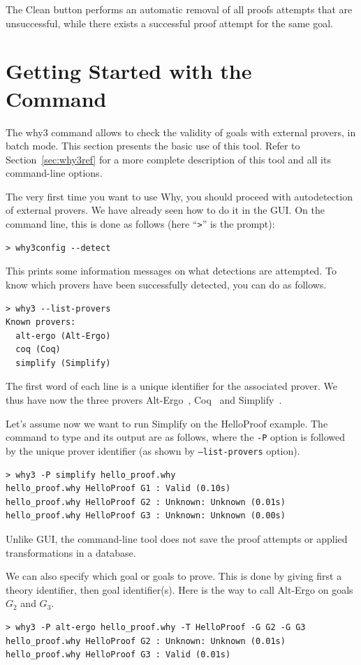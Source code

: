 The \textsf{Clean} button performs an automatic removal of all proofs
attempts that are unsuccessful, while there exists a successful proof
attempt for the same goal.

\section{Getting Started with the \why Command}
\label{sec:batch}

The why3 command allows to check the validity of goals with external
provers, in batch mode. This section presents the basic use of this
tool. Refer to Section~\ref{sec:why3ref} for a more complete
description of this tool and all its command-line options.

The very first time you want to use Why, you should proceed with
autodetection of external provers. We have already seen how to do
it in the \why GUI. On the command line, this is done as follows
(here ``\texttt{>}'' is the prompt):
\begin{verbatim}
> why3config --detect
\end{verbatim}
This prints some information messages on what detections are attempted. To know which
provers have been successfully detected, you can do as follows.
\begin{verbatim}
> why3 --list-provers
Known provers:
  alt-ergo (Alt-Ergo)
  coq (Coq)
  simplify (Simplify)
\end{verbatim}
The first word of each line is a unique identifier for the associated prover. We thus
have now the three provers Alt-Ergo~\cite{ergo}, Coq~\cite{CoqArt} and
Simplify~\cite{simplify05}.

Let's assume now we want to run Simplify on the HelloProof
example. The command to type and its output are as follows, where the
\verb|-P| option is followed by the unique prover identifier (as shown
by \texttt{--list-provers} option).
\begin{verbatim}
> why3 -P simplify hello_proof.why
hello_proof.why HelloProof G1 : Valid (0.10s)
hello_proof.why HelloProof G2 : Unknown: Unknown (0.01s)
hello_proof.why HelloProof G3 : Unknown: Unknown (0.00s)
\end{verbatim}
Unlike \why GUI, the command-line tool does not save the proof attempts
or applied transformations in a database.

We can also specify which goal or goals to prove. This is done by giving
first a theory identifier, then goal identifier(s). Here is the way to
call Alt-Ergo on goals $G_2$ and $G_3$.
\begin{verbatim}
> why3 -P alt-ergo hello_proof.why -T HelloProof -G G2 -G G3
hello_proof.why HelloProof G2 : Unknown: Unknown (0.01s)
hello_proof.why HelloProof G3 : Valid (0.01s)
\end{verbatim}

